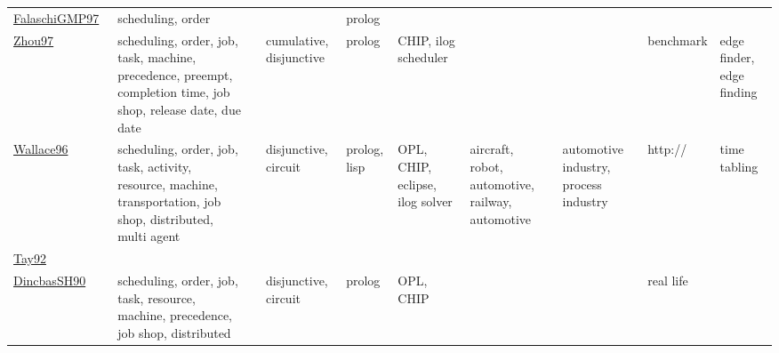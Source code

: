 {\begin{longtable}{p{3cm}p{4cm}p{2cm}p{2cm}p{2cm}p{2cm}p{2cm}p{2cm}p{2cm}p{2cm}}
\href{articles/FalaschiGMP97.pdf}{FalaschiGMP97}~\cite{FalaschiGMP97} & scheduling, order &  &  & prolog &  &  &  &  & \\
\href{articles/Zhou97.pdf}{Zhou97}~\cite{Zhou97} & scheduling, order, job, task, machine, precedence, preempt, completion time, job shop, release date, due date &  & cumulative, disjunctive & prolog & CHIP, ilog scheduler &  &  & benchmark & edge finder, edge finding\\
\href{articles/Wallace96.pdf}{Wallace96}~\cite{Wallace96} & scheduling, order, job, task, activity, resource, machine, transportation, job shop, distributed, multi agent &  & disjunctive, circuit & prolog, lisp & OPL, CHIP, eclipse, ilog solver & aircraft, robot, automotive, railway, automotive & automotive industry, process industry & http:// & time tabling\\
\href{articles/Tay92.pdf}{Tay92}~\cite{Tay92} &  &  &  &  &  &  &  &  & \\
\href{articles/DincbasSH90.pdf}{DincbasSH90}~\cite{DincbasSH90} & scheduling, order, job, task, resource, machine, precedence, job shop, distributed &  & disjunctive, circuit & prolog & OPL, CHIP &  &  & real life & \\
\end{longtable}
}

